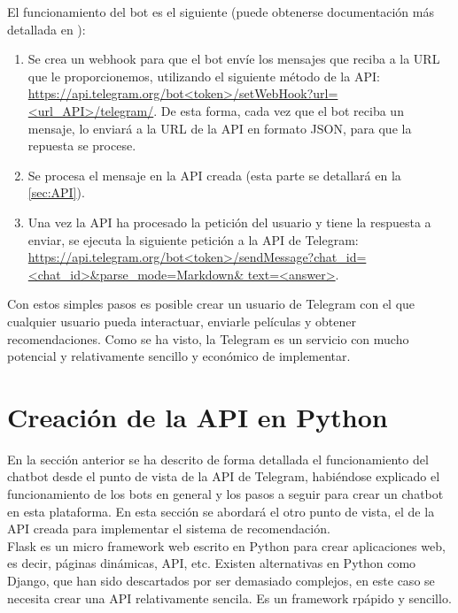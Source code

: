 El funcionamiento del bot es el siguiente (puede obtenerse documentación más detallada en \cite{Telegram}):

\begin{enumerate}
    \item Se crea un webhook para que el bot envíe los mensajes que reciba a la URL que le proporcionemos, utilizando el siguiente método de la API: \url{https://api.telegram.org/bot<token>/setWebHook?url=<url_API>/telegram/}. De esta forma, cada vez que el bot reciba un mensaje, lo enviará a la URL de la API en formato JSON, para que la repuesta se procese.
    \item Se procesa el mensaje en la API creada (esta parte se detallará en la \autoref{sec:API}).
    \item Una vez la API ha procesado la petición del usuario y tiene la respuesta a enviar, se ejecuta la siguiente petición a la API de Telegram: \url{https://api.telegram.org/bot<token>/sendMessage?chat_id=<chat_id>&parse_mode=Markdown& text=<answer>}.
\end{enumerate}

Con estos simples pasos es posible crear un usuario de Telegram con el que cualquier usuario pueda interactuar, enviarle películas y obtener recomendaciones. Como se ha visto, la Telegram es un servicio con mucho potencial y relativamente sencillo y económico de implementar.

\section{Creación de la API en Python} \label{sec:API}

En la sección anterior se ha descrito de forma detallada el funcionamiento del chatbot desde el punto de vista de la API de Telegram, habiéndose explicado el funcionamiento de los bots en general y los pasos a seguir para crear un chatbot en esta plataforma. En esta sección se abordará el otro punto de vista, el de la API creada para implementar el sistema de recomendación.\\

Flask \cite{wiki:FlaskHelloWorld} es un micro framework web escrito en Python para crear aplicaciones web, es decir, páginas dinámicas, API, etc. Existen alternativas en Python como Django, que han sido descartados por ser demasiado complejos, en este caso se necesita crear una API relativamente sencila. Es un framework rpápido y sencillo.

\begin{figure}[H]
    \centering
    \captionsetup{width=7cm}
    
\end{figure}

